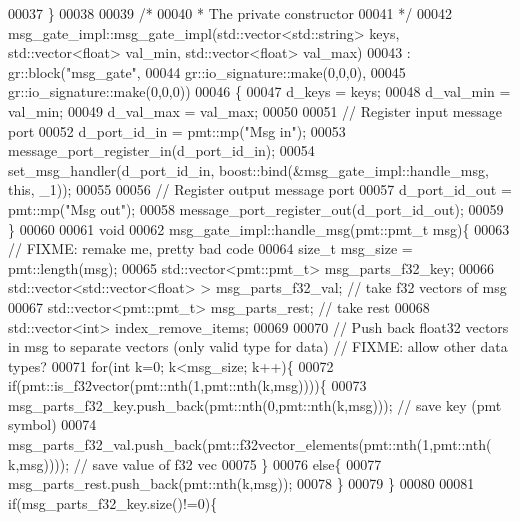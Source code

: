 \begin{DoxyCode}
00037     \}
00038 
00039     \textcolor{comment}{/*}
00040 \textcolor{comment}{     * The private constructor}
00041 \textcolor{comment}{     */}
00042     msg_gate_impl::msg_gate_impl(std::vector<std::string> keys, std::vector<float> val\_min, 
      std::vector<float> val\_max)
00043       : gr::block(\textcolor{stringliteral}{"msg\_gate"},
00044               gr::io\_signature::make(0,0,0),
00045               gr::io\_signature::make(0,0,0))
00046     \{
00047         d_keys = keys;
00048         d_val_min = val\_min;
00049         d_val_max = val\_max;
00050         
00051         \textcolor{comment}{// Register input message port}
00052         d_port_id_in = pmt::mp(\textcolor{stringliteral}{"Msg in"});
00053         message\_port\_register\_in(d_port_id_in);
00054         set\_msg\_handler(d_port_id_in, boost::bind(&msg_gate_impl::handle_msg, \textcolor{keyword}{this}, \_1));
00055         
00056         \textcolor{comment}{// Register output message port}
00057         d_port_id_out = pmt::mp(\textcolor{stringliteral}{"Msg out"});
00058         message\_port\_register\_out(d_port_id_out);
00059     \}
00060     
00061     \textcolor{keywordtype}{void}
00062     msg_gate_impl::handle_msg(pmt::pmt\_t msg)\{
00063         \textcolor{comment}{// FIXME: remake me, pretty bad code}
00064         \textcolor{keywordtype}{size\_t} msg\_size = pmt::length(msg);
00065         std::vector<pmt::pmt\_t> msg\_parts\_f32\_key;
00066         std::vector<std::vector<float> > msg\_parts\_f32\_val; \textcolor{comment}{// take f32 vectors of msg}
00067         std::vector<pmt::pmt\_t> msg\_parts\_rest; \textcolor{comment}{// take rest}
00068         std::vector<int> index\_remove\_items;
00069         
00070         \textcolor{comment}{// Push back float32 vectors in msg to separate vectors (only valid type for data) // FIXME: allow
       other data types?}
00071         \textcolor{keywordflow}{for}(\textcolor{keywordtype}{int} k=0; k<msg\_size; k++)\{
00072             \textcolor{keywordflow}{if}(pmt::is\_f32vector(pmt::nth(1,pmt::nth(k,msg))))\{
00073                 msg\_parts\_f32\_key.push\_back(pmt::nth(0,pmt::nth(k,msg))); \textcolor{comment}{// save key (pmt symbol)}
00074                 msg\_parts\_f32\_val.push\_back(pmt::f32vector\_elements(pmt::nth(1,pmt::nth(
      k,msg)))); \textcolor{comment}{// save value of f32 vec}
00075             \}
00076             \textcolor{keywordflow}{else}\{
00077                 msg\_parts\_rest.push\_back(pmt::nth(k,msg));
00078             \}
00079         \}
00080         
00081         \textcolor{keywordflow}{if}(msg\_parts\_f32\_key.size()!=0)\{

\end{DoxyCode}
